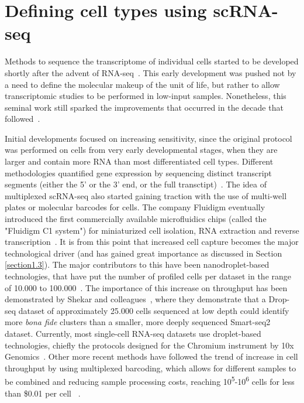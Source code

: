 \section{Defining cell types using scRNA-seq} %
\label{section1.2}

Methods to sequence the transcriptome of individual cells started to be developed shortly after the advent of RNA-seq~\citep{mortazavi_mapping_2008,tang_mrna-seq_2009}. This early development was pushed not by a need to define the molecular makeup of the unit of life, but rather to allow transcriptomic studies to be performed in low-input samples. Nonetheless, this seminal work still sparked the improvements that occurred in the decade that followed~\citep{svensson_exponential_2018}.

Initial developments focused on increasing sensitivity, since the original protocol was performed on cells from very early developmental stages, when they are larger and contain more RNA than most differentiated cell types. Different methodologies quantified gene expression by sequencing distinct transcript segments (either the 5' or the 3' end, or the full transctipt)~\citep{islam_characterization_2011,hashimshony_cel-seq:_2012,ramskold_full-length_2012,picelli_full-length_2014}. The idea of multiplexed scRNA-seq also started gaining traction with the use of multi-well plates or molecular barcodes for cells. The company Fluidigm eventually introduced the first commercially available microfluidics chips (called the "Fluidigm C1 system") for miniaturized cell isolation, RNA extraction and reverse transcription~\citep{brennecke_accounting_2013}. It is from this point that increased cell capture becomes the major technological driver (and has gained great importance as discussed in Section \ref{section1.3}). The major contributors to this have been nanodroplet-based technologies, that have put the number of profiled cells per dataset in the range of 10.000 to 100.000~\citep{macosko_highly_2015,klein_droplet_2015}. The importance of this increase on throughput has been demonstrated by Shekar and colleagues~\citep{shekhar_comprehensive_2016}, where they demonstrate that a Drop-seq dataset of approximately 25.000 cells sequenced at low depth could identify more \textit{bona fide} clusters than a smaller, more deeply sequenced Smart-seq2 dataset. Currently, most single-cell RNA-seq datasets use droplet-based technologies, chiefly the protocols designed for the Chromium instrument by 10x Genomics~\citep{zheng_massively_2017}. Other more recent methods have followed the trend of increase in cell throughput by using multiplexed barcoding, which allows for different samples to be combined and reducing sample processing costs, reaching 10\textsuperscript{5}-10\textsuperscript{6} cells for less than \$0.01 per cell ~\citep{rosenberg_single-cell_2018,cao_single-cell_2019}.

